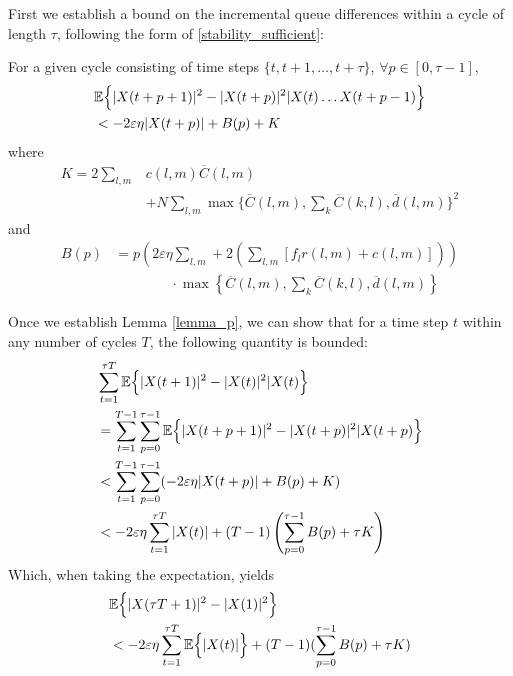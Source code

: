 \label{cycleproof}
First we establish a bound on the incremental queue differences within a cycle of length $\tau$, following the form of \eqref{stability_sufficient}: 
\begin{Lem} \label{lemma_p} 
For a given cycle consisting of time steps $\{t, t+1, \ldots,  t+\tau\}$,  $\forall p \in [0, \tau - 1 ]$, 
\begin{align} \nonumber 
&\expectation{\vert X(t + p + 1)\vert^2 - \vert X(t + p)\vert^2 \vert X(t) \ldots X(t + p - 1)} \\
&< -2\varepsilon \eta \vert X(t + p )\vert + B(p) + K \label{boundCycleMP}
\end{align}
where
\begin{align}  \label{Kdef}
K = 2 \sum_{l,m}&c(l,m)\overline{C}(l,m) \\ \nonumber 
& + N \sum_{l,m} \max\{ \overline{C}(l,m),\sum_{k}\overline{C}(k,l), \overline{d}(l,m) \} ^2
\end{align}
and
\begin{align} \nonumber 
B(p) &= p\left(2\varepsilon \eta  \sum_{l,m} + 2  (\sum_{l,m}[f_{l}r(l,m) + c(l,m)]) \right) \\
& \qquad \qquad \cdot \max\left\{ \overline{C}(l,m),\sum_{k}\overline{C}(k,l),\overline d(l,m) \right\} \label{Cpdef}
\end{align}
\end{Lem}
Once we establish Lemma \ref{lemma_p}, we can show that for a time step $t$ within any number of cycles $T$, the following quantity is bounded:
\begin{align} \nonumber 
&\sum_{t = 1}^{\tau T} \expectation{\vert X(t + 1)\vert^2 - \vert X(t)\vert^2 \vert X(t)}\\ \nonumber
&=\sum_{t=1}^{T-1} \sum_{p=0 }^{\tau - 1} \expectation{\vert X(t + p + 1)\vert^2 - \vert X(t + p)\vert^2 \vert X(t + p)}\\ \nonumber
&< \sum_{t=1}^{T-1} \sum_{p=0 }^{\tau - 1} (-2\varepsilon\eta \vert X(t + p )\vert + B(p) + K ) \\
&< -2\varepsilon \eta \sum_{t=1}^{\tau T} \vert X(t )\vert  + (T - 1) \left(\sum_{p=0 }^{\tau - 1} B(p) + \tau K\right) \label{equivalencestabcycleMP}
\end{align}
Which, when taking the expectation, yields
\begin{align} \nonumber 
& \mathbb{E}\Big\{ \vert X(\tau T + 1)\vert^2 - \vert X(1)\vert^2  \Big\} \\
& <  -2\varepsilon\eta \sum_{t=1}^{\tau T} \mathbb{E}\Big\{ \vert X(t )\vert \Big\}+ (T - 1) ( \sum_{p=0 }^{\tau - 1} B(p) + \tau K)
\end{align}

